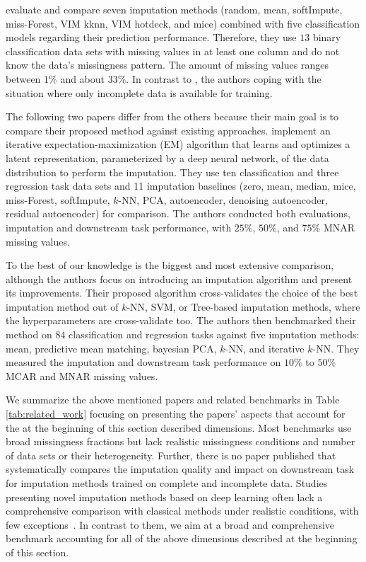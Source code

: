 \cite{Imputation_Benchmark_1} evaluate and compare seven imputation methods (random, mean, softImpute, miss-Forest, VIM kknn, VIM hotdeck, and mice) combined with five classification models regarding their prediction performance. Therefore,  they use $13$ binary classification data sets with missing values in at least one column and do not know the data's missingness pattern. The amount of missing values ranges between $1\%$ and about $33\%$. In contrast to \citep{Imputation_Benchmark_3, Imputation_Benchmark_2}, the authors coping with the situation where only incomplete data is available for training.

The following two papers differ from the others because their main goal is to compare their proposed method against existing approaches. \cite{Imputation_Benchmark_6} implement an iterative expectation-maximization (EM) algorithm that learns and optimizes a latent representation, parameterized by a deep neural network, of the data distribution to perform the imputation. They use ten classification and three regression task data sets and 11 imputation baselines (zero, mean, median, mice, miss-Forest, softImpute, $k$-NN, PCA, autoencoder, denoising autoencoder, residual autoencoder) for comparison. The authors conducted both evaluations, imputation and downstream task performance, with $25\%$, $50\%$, and $75\%$ MNAR missing values.

To the best of our knowledge \citep{Imputation_Benchmark_4} is the biggest and most extensive comparison, although the authors focus on introducing an imputation algorithm and present its improvements. Their proposed algorithm cross-validates the choice of the best imputation method out of $k$-NN, SVM, or Tree-based imputation methods, where the hyperparameters are cross-validate too. The authors then benchmarked their method on $84$ classification and regression tasks against five imputation methods: mean, predictive mean matching, bayesian PCA, $k$-NN, and iterative $k$-NN. They measured the imputation and downstream task performance on $10\%$ to $50\%$ MCAR and MNAR missing values.

We summarize the above mentioned papers and related benchmarks in Table \ref{tab:related_work} focusing on presenting the papers' aspects that account for the at the beginning of this section described dimensions. Most benchmarks use broad missingness fractions but lack realistic missingness conditions and number of data sets or their heterogeneity. Further, there is no paper published that systematically compares the imputation quality and impact on downstream task for imputation methods trained on complete and incomplete data. Studies presenting novel imputation methods based on deep learning often lack a comprehensive comparison with classical methods under realistic conditions, with few exceptions~\citep{Imputation_Benchmark_6}. In contrast to them, we aim at a broad and comprehensive benchmark accounting for all of the above dimensions described at the beginning of this section.

